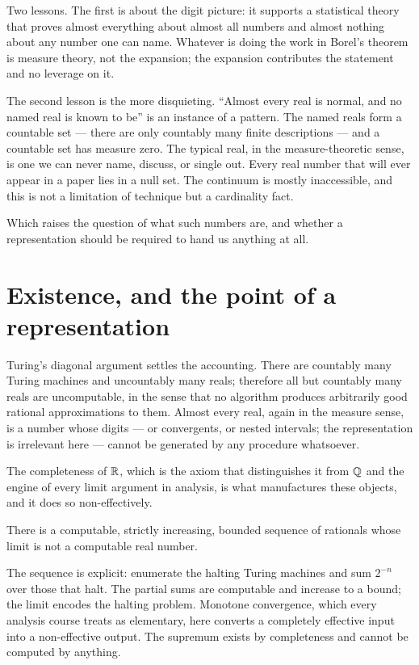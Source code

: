 \documentclass{essay}
\begin{document}
Two lessons. The first is about the digit picture: it supports a statistical
theory that proves almost everything about almost all numbers and almost
nothing about any number one can name. Whatever is doing the work in Borel's
theorem is measure theory, not the expansion; the expansion contributes the
statement and no leverage on it.

The second lesson is the more disquieting. ``Almost every real is normal, and no
named real is known to be'' is an instance of a pattern. The named reals form a
countable set --- there are only countably many finite descriptions --- and a
countable set has measure zero. The typical real, in the measure-theoretic
sense, is one we can never name, discuss, or single out. Every real number that
will ever appear in a paper lies in a null set. The continuum is mostly
inaccessible, and this is not a limitation of technique but a cardinality fact.

Which raises the question of what such numbers are, and whether a representation
should be required to hand us anything at all.

\section{Existence, and the point of a representation}

Turing's diagonal argument settles the accounting. There are countably many
Turing machines and uncountably many reals; therefore all but countably many
reals are uncomputable, in the sense that no algorithm produces arbitrarily good
rational approximations to them. Almost every real, again in the measure sense,
is a number whose digits --- or convergents, or nested intervals; the
representation is irrelevant here --- cannot be generated by any procedure
whatsoever.

The completeness of $\mathbb{R}$, which is the axiom that distinguishes it from $\mathbb{Q}$
and the engine of every limit argument in analysis, is what manufactures these
objects, and it does so non-effectively.

\begin{theorem}[Specker]
There is a computable, strictly increasing, bounded sequence of rationals whose
limit is not a computable real number.
\end{theorem}

The sequence is explicit: enumerate the halting Turing machines and sum
$2^{-n}$ over those that halt. The partial sums are computable and increase to a
bound; the limit encodes the halting problem. Monotone convergence, which every
analysis course treats as elementary, here converts a completely effective input
into a non-effective output. The supremum exists by completeness and cannot be
computed by anything.
\end{document}
